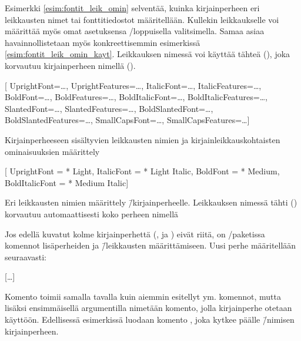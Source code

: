 Esimerkki \ref{esim:fontit_leik_omin} selventää, kuinka kirjainperheen
eri leikkausten nimet tai fonttitiedostot määritellään. Kullekin
leikkaukselle voi määrittää myös omat asetuksensa
\-/loppuisella valitsimella. Samaa asiaa
havainnollistetaan myös konkreettisemmin esimerkissä
\ref{esim:fontit_leik_omin_kayt}. Leikkauksen nimessä voi käyttää tähteä
(\koodi{*}), joka korvautuu kirjainperheen nimellä ().

\begin{esimerkki*}
\begin{koodilohko}
  \setmainfont{…}[
    UprightFont={…},     UprightFeatures={…},
    ItalicFont={…},      ItalicFeatures={…},
    BoldFont={…},        BoldFeatures={…},
    BoldItalicFont={…},  BoldItalicFeatures={…},
    SlantedFont={…},     SlantedFeatures={…},
    BoldSlantedFont={…}, BoldSlantedFeatures={…},
    SmallCapsFont={…},   SmallCapsFeatures={…}]
\end{koodilohko}
\caption{Kirjainperheeseen sisältyvien leikkausten nimien ja
  kirjainleikkauskohtaisten ominaisuuksien määrittely}
\label{esim:fontit_leik_omin}
\end{esimerkki*}

\begin{esimerkki*}
\begin{koodilohko}
  \setmainfont{Macklin Text}[
    UprightFont    = {* Light},
    ItalicFont     = {* Light Italic},
    BoldFont       = {* Medium},
    BoldItalicFont = {* Medium Italic}]
\end{koodilohko}
\caption{Eri leikkausten nimien määrittely 
  \=/kirjainperheelle. Leikkauksen nimessä tähti (\koodi{*}) korvautuu
  automaattisesti koko perheen nimellä}
\label{esim:fontit_leik_omin_kayt}
\end{esimerkki*}

Jos edellä kuvatut kolme kirjainperhettä (,
 ja ) eivät
riitä, on \-/paketissa komennot lisäperheiden ja
\=/leikkausten määrittämiseen. Uusi perhe määritellään seu\-raa\-vasti:

\begin{koodilohkosis}
  […]
\end{koodilohkosis}

Komento  toimii samalla tavalla kuin
aiemmin esitellyt  ym. komennot, mutta
lisäksi ensimmäisellä argumentilla nimetään komento, jolla kirjainperhe
otetaan käyttöön. Edellisessä esimerkissä luodaan komento , joka kytkee päälle 
\=/nimisen kirjainperheen.

